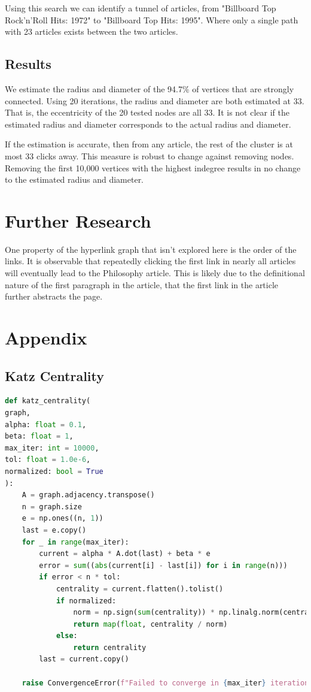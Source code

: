 \documentclass{article}
\begin{document}
Using this search we can identify a tunnel of articles, from "Billboard Top Rock'n'Roll Hits: 1972" to "Billboard Top Hits: 1995". Where only a single path with 23 articles exists between the two articles.


\subsection{Results}

We estimate the radius and diameter of the 94.7\% of vertices that are strongly connected.
Using 20 iterations, the radius and diameter are both estimated at 33. That is, the eccentricity of the 20 tested nodes are all 33.
It is not clear if the estimated radius and diameter corresponds to the actual radius and diameter.

If the estimation is accurate, then from any article, the rest of the cluster is at most 33 clicks away.
This measure is robust to change against removing nodes. Removing the first 10,000 vertices with the highest indegree results in no change to the estimated radius and diameter. 


\section{Further Research}

One property of the hyperlink graph that isn't explored here is the order of the links. It is observable that repeatedly clicking the first link in nearly all articles will eventually lead to the Philosophy article. This is likely due to the definitional nature of the first paragraph in the article, that the first link in the article further abstracts the page.




\section{Appendix}


\subsection{Katz Centrality}
\linespread{1}
\begin{lstlisting}[language=Python]
def katz_centrality(
graph,
alpha: float = 0.1,
beta: float = 1,
max_iter: int = 10000,
tol: float = 1.0e-6,
normalized: bool = True
):
    A = graph.adjacency.transpose()
    n = graph.size
    e = np.ones((n, 1))
    last = e.copy()
    for _ in range(max_iter):
        current = alpha * A.dot(last) + beta * e
        error = sum((abs(current[i] - last[i]) for i in range(n)))
        if error < n * tol:
            centrality = current.flatten().tolist()
            if normalized:
                norm = np.sign(sum(centrality)) * np.linalg.norm(centrality)
                return map(float, centrality / norm)
            else:
                return centrality
        last = current.copy()

    raise ConvergenceError(f"Failed to converge in {max_iter} iterations.")
\end{lstlisting}
\end{document}
